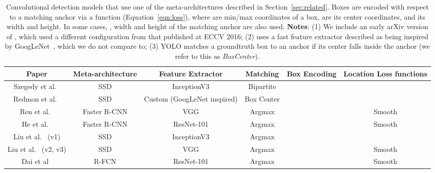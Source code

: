 \documentclass[10pt,twocolumn,letterpaper]{article}
\begin{document}
\begin{table*}
\begin{center}
{\footnotesize
\begin{tabular}{c|c|c|c|c|c}
Paper & Meta-architecture & Feature Extractor & Matching & Box Encoding  & Location Loss functions \\
\hline
Szegedy et al.~\cite{szegedy2014scalable} & SSD & InceptionV3 & Bipartite &  &  \\
Redmon et al.~\cite{redmon2015you} & SSD & Custom (GoogLeNet inspired) & Box Center  &  & \\
Ren et al.~\cite{ren2015faster} & Faster R-CNN & VGG  & Argmax &  & Smooth\\
He et al.~\cite{he2015deep} & Faster R-CNN & ResNet-101  & Argmax &  & Smooth\\
Liu et al.~\cite{liu2015ssd} (v1) & SSD & InceptionV3  & Argmax &   & \\
Liu et al.~\cite{liu2015ssd} (v2, v3) & SSD & VGG  & Argmax &  & Smooth \\
Dai et al~\cite{dai2016r} & R-FCN & ResNet-101  & Argmax &  & Smooth \\
\end{tabular}
}
\vspace{1mm}
\caption{
\footnotesize Convolutional  detection models that use one of the meta-architectures described in Section~\ref{sec:related}.  Boxes are encoded with respect to a matching anchor  via a
function  (Equation~\ref{eqn:loss}), where  are min/max coordinates of a box,  are its center coordinates, and  its width and height.  In some cases, ,  width and height of the matching anchor are also used.
{\bf Notes}: (1) We include an early arXiv version of \cite{liu2015ssd}, which used a different configuration from that published at ECCV 2016; (2) \cite{redmon2015you} uses a fast feature extractor described as being inspired by GoogLeNet~\cite{szegedy2015going}, which we do not compare to; (3) YOLO matches a groundtruth box to an anchor if its center falls inside the anchor (we refer to this as \emph{BoxCenter}).
}\vspace{-6mm}
\label{tab:paper_comparison}
\end{center}
\end{table*}
\end{document}

